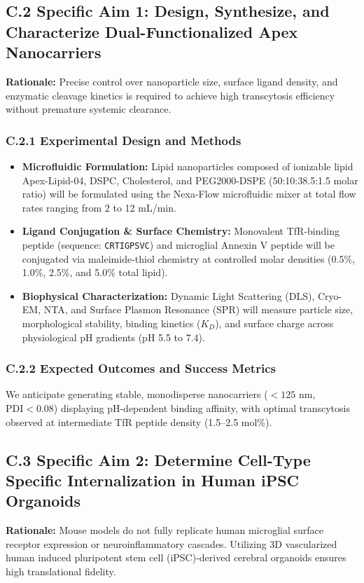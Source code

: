 \documentclass[11pt,letterpaper]{article}
\begin{document}
\subsection{C.2 Specific Aim 1: Design, Synthesize, and Characterize Dual-Functionalized Apex Nanocarriers}
\textbf{Rationale:} Precise control over nanoparticle size, surface ligand density, and enzymatic cleavage kinetics is required to achieve high transcytosis efficiency without premature systemic clearance.

\subsubsection{C.2.1 Experimental Design and Methods}
\begin{itemize}
  \item \textbf{Microfluidic Formulation:} Lipid nanoparticles composed of ionizable lipid Apex-Lipid-04, DSPC, Cholesterol, and PEG2000-DSPE (50:10:38.5:1.5 molar ratio) will be formulated using the Nexa-Flow microfluidic mixer at total flow rates ranging from 2 to 12 mL/min.
  \item \textbf{Ligand Conjugation \& Surface Chemistry:} Monovalent TfR-binding peptide (sequence: \texttt{CRTIGPSVC}) and microglial Annexin V peptide will be conjugated via maleimide-thiol chemistry at controlled molar densities (0.5\%, 1.0\%, 2.5\%, and 5.0\% total lipid).
  \item \textbf{Biophysical Characterization:} Dynamic Light Scattering (DLS), Cryo-EM, NTA, and Surface Plasmon Resonance (SPR) will measure particle size, morphological stability, binding kinetics ($K_D$), and surface charge across physiological pH gradients (pH 5.5 to 7.4).
\end{itemize}

\subsubsection{C.2.2 Expected Outcomes and Success Metrics}
We anticipate generating stable, monodisperse nanocarriers ($<125\text{ nm}$, $\text{PDI} < 0.08$) displaying pH-dependent binding affinity, with optimal transcytosis observed at intermediate TfR peptide density (1.5--2.5 mol\%).

\subsection{C.3 Specific Aim 2: Determine Cell-Type Specific Internalization in Human iPSC Organoids}
\textbf{Rationale:} Mouse models do not fully replicate human microglial surface receptor expression or neuroinflammatory cascades. Utilizing 3D vascularized human induced pluripotent stem cell (iPSC)-derived cerebral organoids ensures high translational fidelity.
\end{document}
